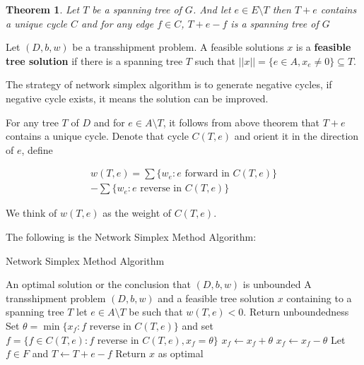 \documentclass[10pt, twocolumn]{book}
\theoremstyle{definition}
\theoremstyle{plain}
\newtheorem{theorem}{Theorem}[chapter]
\theoremstyle{remark}
\begin{document}
			\begin{theorem}
				Let $T$ be a spanning tree of $G$. And let $e\in E\setminus T$ then $T+e$ contains a unique cycle $C$ and for any edge $f\in C$, $T+e-f$ is a spanning tree of $G$
			\end{theorem}

			Let $(D, b, w)$ be a transshipment problem. A feasible solutions $x$ is a \textbf{feasible tree solution} if there is a spanning tree $T$ such that $||x|| = \{e\in A, x_e\neq 0\} \subseteq T$.

			The strategy of network simplex algorithm is to generate negative cycles, if negative cycle exists, it means the solution can be improved.

			For any tree $T$ of $D$ and for $e\in A\setminus T$, it follows from above theorem that $T+e$ contains a unique cycle. Denote that cycle $C(T, e)$ and orient it in the direction of $e$, define 

			\begin{eqnarray}
				w(T, e) = \sum\{w_e: e \text{ forward in } C(T, e)\} \nonumber \\ 
						- \sum\{w_e: e \text{ reverse in } C(T,e)\}
			\end{eqnarray}

			We think of $w(T, e)$ as the weight of $C(T,e)$.

			The following is the Network Simplex Method Algorithm:

			\begin{algorithm}
				\caption{Network Simplex Method Algorithm}
				\begin{algorithmic}
					\ENSURE An optimal solution or the conclusion that $(D, b, w)$ is unbounded
					\REQUIRE A transshipment problem $(D, b, w)$ and a feasible tree solution $x$ containing to a spanning tree $T$
						\STATE let $e \in A \setminus T$ be such that $w(T, e) < 0$.
							\STATE Return unboundedness
						\ELSE
							\STATE Set $\theta = \min\{x_f: f \text{ reverse in } C(T, e)\}$ and set $f = \{f\in C(T, e): f \text{ reverse in } C(T, e), x_f = \theta\}$
								\STATE $x_f \gets x_f + \theta$
							\ELSE
								\STATE $x_f \gets x_f - \theta$
							\ENDIF
							\STATE Let $f \in F$ and $T \gets T+e-f$
						\ENDIF
					\ENDWHILE
					\STATE Return $x$ as optimal					
				\end{algorithmic}
			\end{algorithm}
\end{document}
